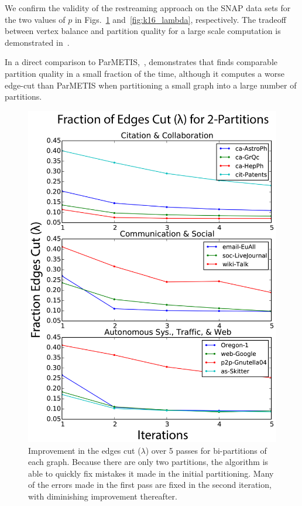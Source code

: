 We confirm the validity of the restreaming approach on the SNAP data sets for the two values of $p$ in Figs.~\ref{fig:k2_lambda} and~\ref{fig:k16_lambda}, respectively. The tradeoff between vertex balance and partition quality for a large scale \ourmethod computation is demonstrated in~.

In a direct comparison to ParMETIS,~, demonstrates that \ourmethod finds comparable partition quality in a small fraction of the time, although it computes a worse edge-cut than ParMETIS when partitioning a small graph into a large number of partitions. 

\begin{figure}[t!]
\centering
\includegraphics[width=0.9\columnwidth] {figures/real_k2_lambda.pdf}
\caption[Caption for]{Improvement in the edges cut ($\lambda$) over 5 passes for bi-partitions of each graph. Because there are only two partitions, the algorithm is able to quickly fix mistakes it made in the initial partitioning. Many of the errors made in the first pass are fixed in the second iteration, with diminishing improvement thereafter.}
\label{fig:k2_lambda}
\end{figure}

